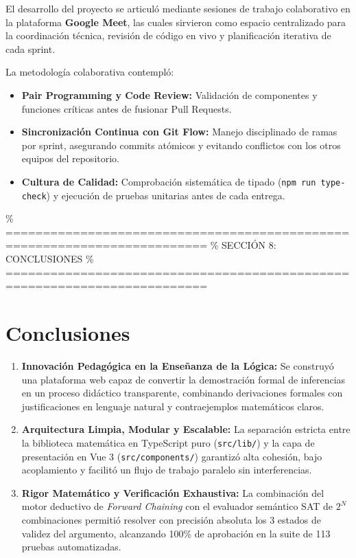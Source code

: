 \documentclass[11pt,a4paper]{article}
\begin{document}
El desarrollo del proyecto se articuló mediante sesiones de trabajo colaborativo en la plataforma \textbf{Google Meet}, las cuales sirvieron como espacio centralizado para la coordinación técnica, revisión de código en vivo y planificación iterativa de cada sprint.

La metodología colaborativa contempló:
\begin{itemize}[leftmargin=1.2cm]
    \item \textbf{Pair Programming y Code Review:} Validación de componentes y funciones críticas antes de fusionar Pull Requests.
    \item \textbf{Sincronización Continua con Git Flow:} Manejo disciplinado de ramas por sprint, asegurando commits atómicos y evitando conflictos con los otros equipos del repositorio.
    \item \textbf{Cultura de Calidad:} Comprobación sistemática de tipado (\texttt{npm run type-check}) y ejecución de pruebas unitarias antes de cada entrega.
\end{itemize}

\% =========================================================================
\% SECCIÓN 8: CONCLUSIONES
\% =========================================================================
\section{Conclusiones}

\begin{enumerate}[label=\textbf{\arabic*.}]
    \item \textbf{Innovación Pedagógica en la Enseñanza de la Lógica:} Se construyó una plataforma web capaz de convertir la demostración formal de inferencias en un proceso didáctico transparente, combinando derivaciones formales con justificaciones en lenguaje natural y contraejemplos matemáticos claros.
    \item \textbf{Arquitectura Limpia, Modular y Escalable:} La separación estricta entre la biblioteca matemática en TypeScript puro (\texttt{src/lib/}) y la capa de presentación en Vue 3 (\texttt{src/components/}) garantizó alta cohesión, bajo acoplamiento y facilitó un flujo de trabajo paralelo sin interferencias.
    \item \textbf{Rigor Matemático y Verificación Exhaustiva:} La combinación del motor deductivo de \textit{Forward Chaining} con el evaluador semántico SAT de $2^N$ combinaciones permitió resolver con precisión absoluta los 3 estados de validez del argumento, alcanzando 100\% de aprobación en la suite de 113 pruebas automatizadas.
\end{enumerate}
\end{document}
